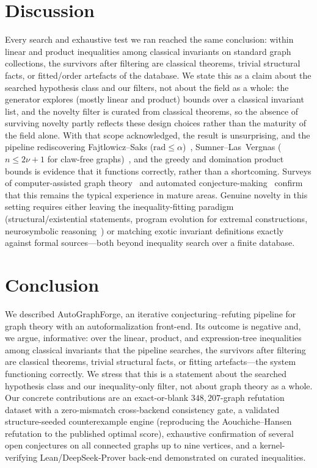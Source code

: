 \documentclass[]{ceurart}
\begin{document}
\section{Discussion}

Every search and exhaustive test we ran reached the same conclusion: within linear and
product inequalities among classical invariants on standard graph collections,
the survivors after filtering are classical theorems, trivial structural facts,
or fitted/order artefacts of the database. We state this as a claim about the searched hypothesis
class and our filters, not about the field as a whole: the generator explores
(mostly linear and product) bounds over a classical invariant list, and the
novelty filter is curated from classical theorems, so the absence of surviving
novelty partly reflects these design choices rather than the maturity of the
field alone. With that scope acknowledged, the result is unsurprising, and the
pipeline rediscovering Fajtlowicz--Saks ($\mathrm{rad}\le\alpha$)~\cite{larson_survey},
Sumner--Las~Vergnas ($n\le2\nu+1$ for claw-free graphs)~\cite{sumner1974graphs}, and the greedy and
domination product bounds is evidence that it functions correctly, rather than a
shortcoming. Surveys of computer-assisted graph theory~\cite{jooken2025computer} and
automated conjecture-making~\cite{larson_survey} confirm that this remains the typical experience
in mature areas. Genuine novelty in this setting requires either leaving the
inequality-fitting paradigm (structural/existential statements, program
evolution for extremal constructions, neurosymbolic reasoning~\cite{feeney2025scalar}) or matching exotic invariant definitions
exactly against formal sources---both beyond inequality search over a finite
database.

\section{Conclusion}
\label{sec:conclusion}
We described \textsf{AutoGraphForge}, an iterative conjecturing--refuting pipeline for graph theory
with an autoformalization front-end. Its outcome is negative and, we argue, informative:
over the linear, product, and expression-tree inequalities among classical invariants that the
pipeline searches, the survivors after filtering are classical theorems, trivial structural facts,
or fitting artefacts---the system functioning correctly. We stress that this is a statement about
the searched hypothesis class and our inequality-only filter, not about graph theory as a whole. Our concrete contributions are an exact-or-blank $348{,}207$-graph
refutation dataset with a zero-mismatch cross-backend consistency gate, a validated structure-seeded
counterexample engine (reproducing the Aouchiche--Hansen refutation to the published optimal score),
exhaustive confirmation of several open conjectures on all connected graphs up to nine vertices, and
a kernel-verifying Lean/DeepSeek-Prover back-end demonstrated on curated inequalities.
\end{document}
